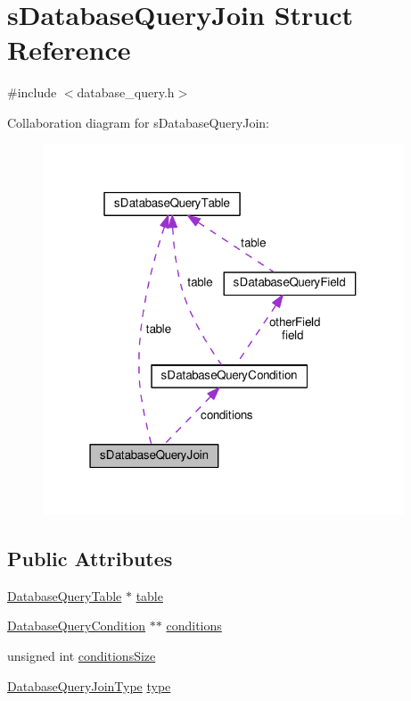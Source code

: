 \hypertarget{structsDatabaseQueryJoin}{}\section{s\+Database\+Query\+Join Struct Reference}
\label{structsDatabaseQueryJoin}


{\ttfamily \#include $<$database\+\_\+query.\+h$>$}



Collaboration diagram for s\+Database\+Query\+Join\+:\nopagebreak
\begin{figure}[H]
\begin{center}
\leavevmode
\includegraphics[width=304pt]{structsDatabaseQueryJoin__coll__graph}
\end{center}
\end{figure}
\subsection*{Public Attributes}
\begin{DoxyCompactItemize}
\item 
\hyperlink{database__query_8h_a38971f81715db3c243144b5e840c2457}{Database\+Query\+Table} $\ast$ \hyperlink{structsDatabaseQueryJoin_acbf5a41cfc09cd83a76141f6c9062917}{table}
\item 
\hyperlink{database__query_8h_a6266221c78d9f12aa27ae522162f414f}{Database\+Query\+Condition} $\ast$$\ast$ \hyperlink{structsDatabaseQueryJoin_a0c9a74a0b86f72c5b70caae49d39fd05}{conditions}
\item 
unsigned int \hyperlink{structsDatabaseQueryJoin_a5e0ea926de3b76b97479d26be2f5d935}{conditions\+Size}
\item 
\hyperlink{database__query_8h_abd7f182a993afec8e1b9946d52eafbbd}{Database\+Query\+Join\+Type} \hyperlink{structsDatabaseQueryJoin_ad0a33e6334f09c044be0d360d87cf21e}{type}
\end{DoxyCompactItemize}


